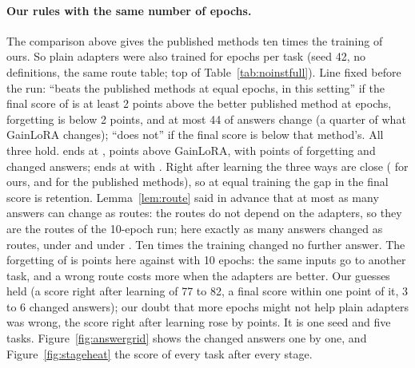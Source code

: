 \paragraph{Our rules with the same number of epochs.} The comparison above gives the published methods ten times the training of ours. So plain adapters were also trained for \AudFullEpochs{} epochs per task (seed 42, no definitions, the same route table; top of Table~\ref{tab:noinstfull}).
Line fixed before the run: ``beats the published methods at equal epochs, in this setting'' if the final score of \recog{} is at least 2 points above the better published method at \AudFullEpochs{} epochs, forgetting is below 2 points, and at most 44 of \AudFullCompared{} answers change (a quarter of what GainLoRA changes); ``does not'' if the final score is below that method's.
All three hold. \recog{} ends at \AudFullOursRidgeAP{}, \AudFullOursRidgeAboveGainlora{} points above GainLoRA, with \AudFullOursRidgeFT{} points of forgetting and \AudFullOursRidgeChanged{} changed answers; \handicap{} ends at \AudFullOursHandicapAP{} with \AudFullOursHandicapChanged{}.
Right after learning the three ways are close (\AudFullOursRidgeLearned{} for ours, \AudFullInfloraLearned{} and \AudFullGainloraLearned{} for the published methods), so at equal training the gap in the final score is retention.
Lemma~\ref{lem:route} said in advance that at most as many answers can change as routes: the routes do not depend on the adapters, so they are the routes of the 10-epoch run; here exactly as many answers changed as routes, \AudFullOursRidgeChanged{} under \recog{} and \AudFullOursHandicapChanged{} under \handicap{}. Ten times the training changed no further answer.
The forgetting of \recog{} is \AudFullOursRidgeFT{} points here against \AudOursRidgeFT{} with 10 epochs: the same inputs go to another task, and a wrong route costs more when the adapters are better.
Our guesses held (a score right after learning of 77 to 82, a final score within one point of it, 3 to 6 changed answers); our doubt that more epochs might not help plain adapters was wrong, the score right after learning rose by \AudFullOursLearnedGain{} points.
It is one seed and five tasks. Figure~\ref{fig:answergrid} shows the changed answers one by one, and Figure~\ref{fig:stageheat} the score of every task after every stage.





